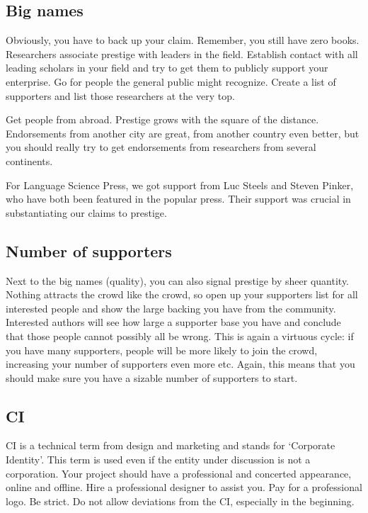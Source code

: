 \documentclass[guidelines,nonflat,modfonts] {langsci/langscibook}
\begin{document}
\subsection{Big names}
Obviously, you have to back up your claim. Remember, you still have zero books. Researchers associate prestige with leaders in the field. Establish contact with all leading scholars in your field and try to get them to publicly support your enterprise. Go for people the general public might recognize. Create a list of supporters and list those researchers at the very top.  

Get people from abroad. Prestige grows with the square of the distance. Endorsements from another city are great, from another country even better, but you should really try to get endorsements from researchers from several continents. 

For Language Science Press, we got support from Luc Steels and Steven Pinker, who have both been featured in the popular press. Their support was crucial in substantiating our claims to prestige. 

\subsection{Number of supporters}
Next to the big names (quality), you can also signal prestige by sheer quantity. Nothing attracts the crowd like the crowd, so open up your supporters list for all interested people and show the large backing you have from the community. Interested authors will see how large a supporter base you have and conclude that those people cannot possibly all be wrong. This is again a virtuous cycle: if you have many supporters, people will be more likely to join the crowd, increasing your number of supporters even more etc. Again, this means that you should make sure you have a sizable number of supporters to start. 


 
\subsection{CI}
CI is a technical term from design and marketing and stands for `Corporate Identity'. This term is used even if the entity under discussion is not a corporation. Your project should have a professional and concerted appearance, online and offline. Hire a professional designer to assist you. Pay for a professional logo. Be strict. Do not allow deviations from the CI, especially in the beginning.
\end{document}
